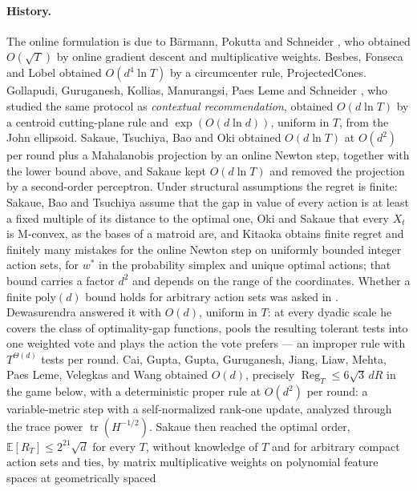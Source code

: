 \documentclass[11pt]{article}
\theoremstyle{plain}
\theoremstyle{definition}
\theoremstyle{remark}
\DeclareMathOperator{\tr}{tr}
\DeclareMathOperator{\Reg}{Reg}
\newcommand{\E}{\mathbb{E}}
\newcommand{\wstar}{w^{\ast}}
\begin{document}
\paragraph{History.} The online formulation is due to B\"armann, Pokutta and Schneider
\cite{Barmann17,Barmann20}, who obtained $O(\sqrt T)$ by online gradient descent and multiplicative
weights. Besbes, Fonseca and Lobel \cite{Besbes21,Besbes25} obtained $O(d^{4}\ln T)$ by a
circumcenter rule, ProjectedCones. Gollapudi, Guruganesh, Kollias, Manurangsi, Paes Leme and
Schneider \cite{GGKMPS}, who studied the same protocol as \emph{contextual recommendation},
obtained $O(d\ln T)$ by a centroid cutting-plane rule and $\exp(O(d\ln d))$, uniform in $T$, from
the John ellipsoid. Sakaue, Tsuchiya, Bao and Oki \cite{SakaueONS} obtained $O(d\ln T)$ at
$O(d^{2})$ per round plus a Mahalanobis projection by an online Newton step, together with the
lower bound above, and Sakaue \cite{SakaueSOP} kept $O(d\ln T)$ and removed the projection by a
second-order perceptron. Under structural assumptions the regret is finite: Sakaue, Bao and
Tsuchiya \cite{SakaueFY} assume that the gap in value of every action is at least a fixed multiple
of its distance to the optimal one, Oki and Sakaue \cite{OkiSakaue} that every $X_t$ is
$\mathrm{M}$-convex, as the bases of a matroid are, and Kitaoka \cite{Kitaoka26} obtains finite
regret and finitely many mistakes for the online Newton step on uniformly bounded integer action
sets, for $\wstar$ in the probability simplex and unique optimal actions; that bound carries a
factor $d^{2}$ and depends on the range of the coordinates. Whether a finite $\mathrm{poly}(d)$
bound holds for arbitrary action sets was asked in \cite{GGKMPS,OkiSakaue}. Dewasurendra
\cite{Dewasurendra26} answered it with $O(d)$, uniform in $T$: at every dyadic scale he covers the
class of optimality-gap functions, pools the resulting tolerant tests into one weighted vote and
plays the action the vote prefers --- an improper rule with $T^{\Theta(d)}$ tests per round. Cai,
Gupta, Gupta, Guruganesh, Jiang, Liaw, Mehta, Paes Leme, Velegkas and Wang \cite{Cai26} obtained
$O(d)$, precisely $\Reg_T\le6\sqrt3\,dR$ in the game below, with a deterministic proper rule at
$O(d^{2})$ per round: a variable-metric step with a self-normalized rank-one update, analyzed
through the trace power $\tr(H^{-1/2})$. Sakaue \cite{SakaueMMW} then reached the optimal order,
$\E[R_T]\le2^{21}\sqrt d$ for every $T$, without knowledge of $T$ and for arbitrary compact action
sets and ties, by matrix multiplicative weights on polynomial feature spaces at geometrically spaced
\end{document}

